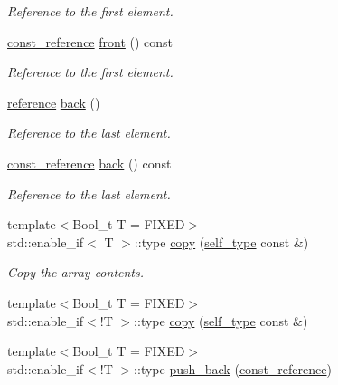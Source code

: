 \begin{DoxyCompactItemize}
\begin{DoxyCompactList}\small\item\em Reference to the first element. \end{DoxyCompactList}\item 
\hyperlink{classpanda_1_1Container_a336135bd19b8b176006d8e7413c8c8f1}{const\-\_\-reference} \hyperlink{classpanda_1_1Container_a6daddef3d20713f67ff6dffa6b9f76d5}{front} () const 
\begin{DoxyCompactList}\small\item\em Reference to the first element. \end{DoxyCompactList}\item 
\hyperlink{classpanda_1_1Container_a3b6330ccf0d9ed33975d098520f103cb}{reference} \hyperlink{classpanda_1_1Container_a61bb66309ba1c1472097808caf751200}{back} ()
\begin{DoxyCompactList}\small\item\em Reference to the last element. \end{DoxyCompactList}\item 
\hyperlink{classpanda_1_1Container_a336135bd19b8b176006d8e7413c8c8f1}{const\-\_\-reference} \hyperlink{classpanda_1_1Container_a107b6a540d60b7435a8a6b337c7683b8}{back} () const 
\begin{DoxyCompactList}\small\item\em Reference to the last element. \end{DoxyCompactList}\item 
{\footnotesize template$<$Bool\-\_\-t T = F\-I\-X\-E\-D$>$ }\\std\-::enable\-\_\-if$<$ T $>$\-::type \hyperlink{classpanda_1_1Container_a47bf4140207c40fa731f44766dde536c}{copy} (\hyperlink{classpanda_1_1Container_a3c67ee697decfd9da487194415cce212}{self\-\_\-type} const \&)
\begin{DoxyCompactList}\small\item\em Copy the array contents. \end{DoxyCompactList}\item 
{\footnotesize template$<$Bool\-\_\-t T = F\-I\-X\-E\-D$>$ }\\std\-::enable\-\_\-if$<$!T $>$\-::type \hyperlink{classpanda_1_1Container_a05e9a487429721164541511d87a9783d}{copy} (\hyperlink{classpanda_1_1Container_a3c67ee697decfd9da487194415cce212}{self\-\_\-type} const \&)
\item 
{\footnotesize template$<$Bool\-\_\-t T = F\-I\-X\-E\-D$>$ }\\std\-::enable\-\_\-if$<$!T $>$\-::type \hyperlink{classpanda_1_1Container_a76172a1fe008ef5a1050de054fae774e}{push\-\_\-back} (\hyperlink{classpanda_1_1Container_a336135bd19b8b176006d8e7413c8c8f1}{const\-\_\-reference})

\end{DoxyCompactItemize}
